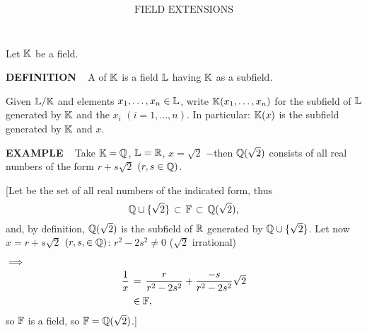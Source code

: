 \newpage


\[
\text{FIELD EXTENSIONS}
\]

\ \indent 

Let $\mathbb{K}$ be a field.

\vspace{0.3cm}

\begin{x}{\small\bf DEFINITION} \ %
A 
of $\mathbb{K}$ is a field $\mathbb{L}$ having $\mathbb{K}$ as a subfield.  
\end{x}

\vspace{0.1cm}

Given $\mathbb{L}/\mathbb{K}$ and elements $x_1, \ldots, x_n \in \mathbb{L}$, write $\mathbb{K}(x_1, \ldots, x_n)$ for the subfield of $\mathbb{L}$ 
generated by $\mathbb{K}$ and the $x_i$ $(i = 1, \ldots, n)$.  In particular: $\mathbb{K}(x)$ is the subfield generated by $\mathbb{K}$ and $x$.

\begin{x}{\small\bf EXAMPLE} \ %
Take $\mathbb{K} = \mathbb{Q}$, $\mathbb{L} = \mathbb{R}$, $x = \sqrt{2}$ $-$then $\mathbb{Q}(\sqrt{2})$ consists of all real numbers of the form 
$r + s \sqrt{2}$ $(r, s \in \mathbb{Q})$.

\vspace{0.1cm}

[Let \mF be the set of all real numbers of the indicated form, thus
\[
\mathbb{Q} \cup \{\sqrt{2}\} \hspace{0.05cm} \subset \hspace{0.05cm} \mathbb{F} \hspace{0.05cm} \subset \hspace{0.05cm} \mathbb{Q}(\sqrt{2}),
\]
and, by definition, $\mathbb{Q}(\sqrt{2})$ is the subfield of $\mathbb{R}$  generated by $\mathbb{Q} \cup \{\sqrt{2}\}$.  
Let now 
$x = r + s \sqrt{2}$ $(r, s, \in \mathbb{Q})$: $r^2 - 2 s^2 \neq 0$ ($\sqrt{2}$ irrational)

\qquad\qquad\qquad\qquad $\implies$
\begin{align*}
\frac{1}{x} \hspace{0.05cm} 
&= \hspace{0.05cm} \frac{r}{r^2 - 2 s^2} + \frac{-s}{r^2 - 2 s^2} \sqrt{2}\\
&\in \mathbb{F},
\end{align*}
so $\mathbb{F}$ is a field, so $\mathbb{F} = \mathbb{Q}(\sqrt{2})$.]
\end{x}

\vspace{0.1cm}

